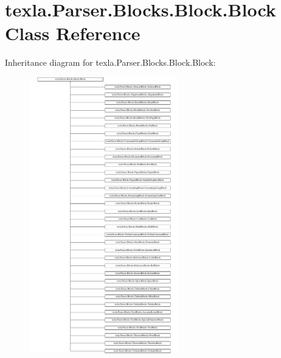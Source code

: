 \hypertarget{classtexla_1_1Parser_1_1Blocks_1_1Block_1_1Block}{}\section{texla.\+Parser.\+Blocks.\+Block.\+Block Class Reference}
\label{classtexla_1_1Parser_1_1Blocks_1_1Block_1_1Block}
Inheritance diagram for texla.\+Parser.\+Blocks.\+Block.\+Block\+:\begin{figure}[H]
\begin{center}
\leavevmode
\includegraphics[height=12.000000cm]{classtexla_1_1Parser_1_1Blocks_1_1Block_1_1Block}
\end{center}
\end{figure}
